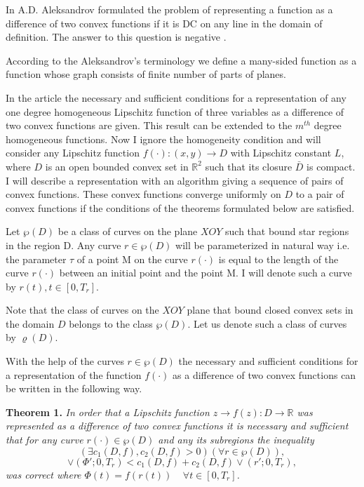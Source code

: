 \documentclass[12pt]{llncs}
\begin{document}
In \cite{aleksandrov1} A.D. Aleksandrov formulated the problem of
representing a function as a difference of two convex functions if
it is  DC on any line in the domain of definition. The answer to
this question is negative \cite{vesely}.


According to the Aleksandrov's terminology we define a many-sided
function as a function whose graph consists of finite number of
parts of planes.

In the article \cite{proudconvex1} the necessary and sufficient
conditions for a representation of any one degree homogeneous
Lipschitz function of three  variables as a difference of two
convex functions are given. This result can be extended to the
$m^{th}$ degree homogeneous functions. Now I ignore the
homogeneity condition and will consider any Lipschitz function
$f(\cdot): (x,y) \rightarrow D $ with Lipschitz constant $L$,
where $D$ is an open bounded convex set in $\mathbb{R} ^2$ such
that its closure $\bar{D}$ is compact. I will describe a
representation with an algorithm giving a sequence of pairs of
convex functions. These convex functions converge uniformly on $D$
to a pair of convex functions if the conditions of the theorems
formulated below are satisfied.

Let $\wp(D)$ be a class of curves on the plane  $XOY$  such that
bound star regions  in the region D. Any curve $r \in \wp(D)$ will
be parameterized in natural way i.e. the parameter $\tau$  of a
point M on the curve  $r(\cdot)$ is equal to the length of the
curve $r(\cdot)$ between an initial point and the point M. I will
denote such a curve by $r(t), t \in [0,T_r]$.

Note that the class of curves on the $XOY$ plane that bound closed
convex sets in the domain $D$ belongs to the class $\wp(D)$. Let
us denote such a class of curves by $\varrho(D)$.

With the help of the curves $r \in \wp (D)$  the necessary and
sufficient conditions for a representation of the function
$f(\cdot)$  as a difference of two convex functions can be written
in the following way.

{\bf Theorem 1.} {\em In order that a Lipschitz function $z
\rightarrow f(z):D \rightarrow \mathbb{R}$ was represented as a
difference of two convex functions it is necessary and sufficient
that for any curve $r(\cdot) \in \wp(D)$ and any its subregions
the inequality
$$
 (\exists c_1(D,f), c_2(D,f)>0) (\forall r \in \wp(D)) ,
$$
\begin{equation}
 \vee (\Phi'; 0,T_r)<  c_1(D,f) + c_2(D,f) \vee (r';
 0,T_r), \label{difconv3}
\end{equation} was correct where $\Phi(t)=f(r(t)) \;\;\;\; \forall t \in
[0,T_r]$. \label{difconvexthm1}}
\end{document}
